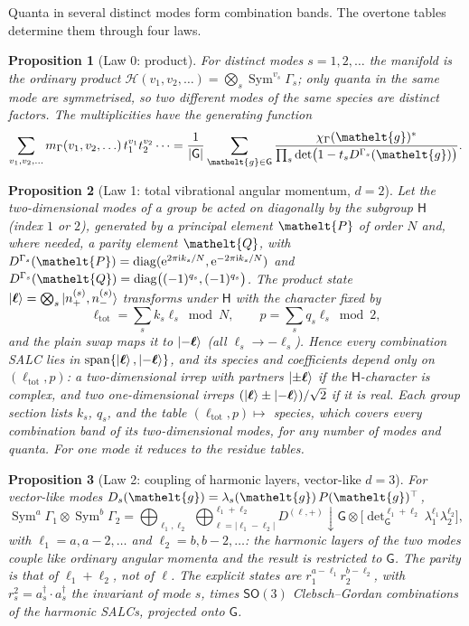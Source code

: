 \documentclass[11pt]{article}
\newcommand{\eltfont}[1]{{\let\sigma\eltsigma\mathelt{#1}}}
\newcommand{\grp}[1]{\mathsf{#1}}
\newcommand{\elt}[1]{\eltfont{#1}}
\newcommand{\restr}[2]{#1\!\downarrow#2}
\newcommand{\iunit}{\mathrm{i}}
\newcommand{\expe}{\mathrm{e}}
\newcommand{\irrJp}[2]{D^{(#1,#2)}}
\newcommand{\diag}{\operatorname{diag}}
\newcommand{\gel}{\elt{g}}             %
\newcommand{\gmat}{P(\gel)^{\top}}     %
\newcommand{\pel}{\elt{P}}             %
\newcommand{\qel}{\elt{Q}}             %
\newtheorem{proposition}{Proposition}
\begin{document}
Quanta in several distinct modes form combination bands. The overtone tables determine them through four laws.

\begin{proposition}[Law 0: product]
For distinct modes $s=1,2,\ldots$ the manifold is the ordinary product $\mathcal H(v_1,v_2,\ldots)=\bigotimes_s\operatorname{Sym}^{v_s}\Gamma_s$; only quanta in the same mode are symmetrised, so two different modes of the same species are distinct factors. The multiplicities have the generating function
\[
\sum_{v_1,v_2,\ldots}m_\Gamma(v_1,v_2,\ldots)\,t_1^{v_1}t_2^{v_2}\cdots=\frac1{|\grp{G}|}\sum_{\gel\in\grp{G}}\frac{\chi_\Gamma(\gel)^*}{\prod_s\det\bigl(1-t_sD^{\Gamma_s}(\gel)\bigr)} .
\]
\end{proposition}

\begin{proposition}[Law 1: total vibrational angular momentum, $d=2$]
Let the two-dimensional modes of a group be acted on diagonally by the subgroup $\grp{H}$ (index $1$ or $2$), generated by a principal element $\pel$ of order $N$ and, where needed, a parity element $\qel$, with $D^{\Gamma_s}(\pel)=\diag(\expe^{2\pi\iunit k_s/N},\expe^{-2\pi\iunit k_s/N})$ and $D^{\Gamma_s}(\qel)=\diag\bigl((-1)^{q_s},(-1)^{q_s}\bigr)$. The product state $\ket{\boldsymbol\ell}=\bigotimes_s\ket{n^{(s)}_+,n^{(s)}_-}$ transforms under $\grp{H}$ with the character fixed by
\[
\ell_{\mathrm{tot}}=\sum_sk_s\ell_s\bmod N,\qquad p=\sum_sq_s\ell_s\bmod 2 ,
\]
and the plain swap maps it to $\ket{-\boldsymbol\ell}$ (all $\ell_s\to-\ell_s$). Hence every combination SALC lies in $\mathrm{span}\{\ket{\boldsymbol\ell},\ket{-\boldsymbol\ell}\}$, and its species and coefficients depend only on $(\ell_{\mathrm{tot}},p)$: a two-dimensional irrep with partners $\ket{\pm\boldsymbol\ell}$ if the $\grp{H}$-character is complex, and two one-dimensional irreps $(\ket{\boldsymbol\ell}\pm\ket{-\boldsymbol\ell})/\sqrt2$ if it is real. Each group section lists $k_s$, $q_s$, and the table $(\ell_{\mathrm{tot}},p)\mapsto$ species, which covers every combination band of its two-dimensional modes, for any number of modes and quanta. For one mode it reduces to the residue tables.
\end{proposition}

\begin{proposition}[Law 2: coupling of harmonic layers, vector-like $d=3$]
For vector-like modes $D_s(\gel)=\lambda_s(\gel)\,\gmat$,
\[
\operatorname{Sym}^{a}\Gamma_1\otimes\operatorname{Sym}^{b}\Gamma_2=\bigoplus_{\ell_1,\ell_2}\ \bigoplus_{\ell=|\ell_1-\ell_2|}^{\ell_1+\ell_2}\restr{\irrJp{\ell}{+}}{\grp{G}}\otimes\bigl[\det\nolimits_{\grp{G}}^{\ell_1+\ell_2}\lambda_1^{\ell_1}\lambda_2^{\ell_2}\bigr],
\]
with $\ell_1=a,a-2,\ldots$ and $\ell_2=b,b-2,\ldots$: the harmonic layers of the two modes couple like ordinary angular momenta and the result is restricted to $\grp{G}$. The parity is that of $\ell_1+\ell_2$, not of $\ell$. The explicit states are $r_1^{a-\ell_1}r_2^{b-\ell_2}$, with $r_s^2=a^\dagger_s\!\cdot a^\dagger_s$ the invariant of mode $s$, times $\grp{SO}(3)$ Clebsch--Gordan combinations of the harmonic SALCs, projected onto $\grp{G}$.
\end{proposition}
\end{document}
